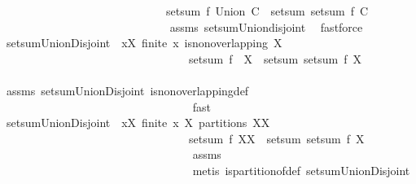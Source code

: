 \begin{isabellebody}
\ \ \ \ \ \ \ \ \ \ \ \ \ \ \ \ \ \ \ \ \ \ \ \ \ \ \ \ \ {\isachardoublequoteopen}setsum\ f\ {\isacharparenleft}Union\ C{\isacharparenright}\ {\isacharequal}\ setsum\ {\isacharparenleft}setsum\ f{\isacharparenright}\ C{\isachardoublequoteclose}\ \isanewline
%
\isadelimproof
\ \ \ \ \ \ \ \ \ \ \ \ \ \ \ \ \ \ \ \ \ \ \ \ \ \ \ \ %
\endisadelimproof
%
\isatagproof
{}\isamarkupfalse%
\ assms\ setsum{\isachardot}Union{\isacharunderscore}disjoint\ \isamarkupfalse%
\ fastforce%
\endisatagproof
{\isafoldproof}%
%
\isadelimproof
\isanewline
%
\endisadelimproof
\isanewline
{}\isamarkupfalse%
\ setsumUnionDisjoint{}{\isacharcolon}\ \ {\isachardoublequoteopen}{\isasymforall}x{\isasymin}X{\isachardot}\ finite\ x{\isachardoublequoteclose}\ {\isachardoublequoteopen}is{\isacharunderscore}non{\isacharunderscore}overlapping\ X{\isachardoublequoteclose}\ \isanewline
\ \ \ \ \ \ \ \ \ \ \ \ \ \ \ \ \ \ \ \ \ \ \ \ \ \ \ \ \ \ \ \ \ {\isachardoublequoteopen}setsum\ f\ {\isacharparenleft}{\isasymUnion}\ X{\isacharparenright}\ {\isacharequal}\ setsum\ {\isacharparenleft}setsum\ f{\isacharparenright}\ X{\isachardoublequoteclose}\ \isanewline
%
\isadelimproof
\ \ \ \ \ \ \ \ \ \ \ \ \ \ \ \ \ \ \ \ \ \ \ \ \ \ \ \ \ \ \ \ %
\endisadelimproof
%
\isatagproof
{}\isamarkupfalse%
\ assms\ setsumUnionDisjoint{}\ is{\isacharunderscore}non{\isacharunderscore}overlapping{\isacharunderscore}def\ \isanewline
\ \ \ \ \ \ \ \ \ \ \ \ \ \ \ \ \ \ \ \ \ \ \ \ \ \ \ \ \ \ \ \ \isamarkupfalse%
\ fast%
\endisatagproof
{\isafoldproof}%
%
\isadelimproof
\isanewline
%
\endisadelimproof
\isanewline
{}\isamarkupfalse%
\ setsumUnionDisjoint{}{\isacharcolon}\ \ {\isachardoublequoteopen}{\isasymforall}x{\isasymin}X{\isachardot}\ finite\ x{\isachardoublequoteclose}\ {\isachardoublequoteopen}X\ partitions\ XX{\isachardoublequoteclose}\ \isanewline
\ \ \ \ \ \ \ \ \ \ \ \ \ \ \ \ \ \ \ \ \ \ \ \ \ \ \ \ \ \ \ \ \ {\isachardoublequoteopen}setsum\ f\ XX\ {\isacharequal}\ setsum\ {\isacharparenleft}setsum\ f{\isacharparenright}\ X{\isachardoublequoteclose}\ \isanewline
%
\isadelimproof
\ \ \ \ \ \ \ \ \ \ \ \ \ \ \ \ \ \ \ \ \ \ \ \ \ \ \ \ \ \ \ \ %
\endisadelimproof
%
\isatagproof
{}\isamarkupfalse%
\ assms\ \isanewline
\ \ \ \ \ \ \ \ \ \ \ \ \ \ \ \ \ \ \ \ \ \ \ \ \ \ \ \ \ \ \ \ \isamarkupfalse%
\ {\isacharparenleft}metis\ is{\isacharunderscore}partition{\isacharunderscore}of{\isacharunderscore}def\ setsumUnionDisjoint{}{\isacharparenright}%

\end{isabellebody}
